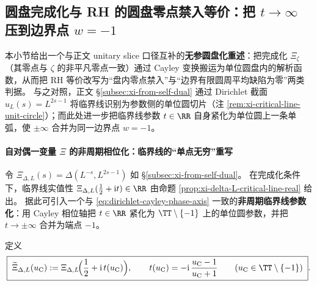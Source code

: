 \subsection{圆盘完成化与 RH 的圆盘零点禁入等价：把 \texorpdfstring{$t\to\infty$}{t->infty} 压到边界点 \texorpdfstring{$w=-1$}{w=-1}}\label{subsec:unit-disk-rh-equivalence}
本小节给出一个与正文 unitary slice 口径互补的\textbf{无参圆盘化重述}：把完成化 \(\Xi_{\zeta}\)（其零点与 \(\zeta\) 的非平凡零点一致）通过 Cayley 变换搬运为单位圆盘内的解析函数，从而把 RH 等价改写为“盘内零点禁入”与“边界有限圆周平均缺陷为零”两类判据。
与之对照，正文 \S\ref{subsec:xi-from-self-dual} 通过 Dirichlet 截面 \(u_L(s)=L^{2s-1}\) 将临界线识别为参数侧的单位圆切片（注 \ref{rem:xi-critical-line-unit-circle}）；而此处进一步把临界线参数 \(t\in\RR\) 自身紧化为单位圆上一条单弧，使 \(\pm\infty\) 合并为同一边界点 \(w=-1\)。

\paragraph{自对偶一变量 \texorpdfstring{$\Xi$}{Xi} 的非周期相位化：临界线的“单点无穷”重写}
令 \(\Xi_{\Delta,L}(s)=\Delta(L^{-s},L^{2s-1})\) 如 \S\ref{subsec:xi-from-self-dual}。
在完成化条件下，临界线实值性
\(
\Xi_{\Delta,L}(\tfrac12+\mathrm{i}t)\in\RR
\)
由命题 \ref{prop:xi-delta-L-critical-line-real} 给出。
据此可引入一个与 \eqref{eq:dirichlet-cayley-phase-axis} 一致的\textbf{非周期临界线参数化}：用 Cayley 相位轴把 \(t\in\RR\) 紧化为 \(\TT\setminus\{-1\}\) 上的单位圆参数，并把 \(t\to\pm\infty\) 合并为端点 \(-1\)。

\begin{definition}[非周期临界线相位化]\label{def:xi-nonperiodic-phase}
定义
\begin{equation}\label{eq:xi-nonperiodic-phase}
\boxed{\;
\widetilde{\Xi}_{\Delta,L}(u_{\mathrm C})
:=\Xi_{\Delta,L}\!\Bigl(\frac12+\mathrm{i}\,t(u_{\mathrm C})\Bigr),
\qquad
t(u_{\mathrm C})=-\mathrm{i}\,\frac{u_{\mathrm C}-1}{u_{\mathrm C}+1}
\qquad
(u_{\mathrm C}\in\TT\setminus\{-1\})\; }.
\end{equation}
\end{definition}

